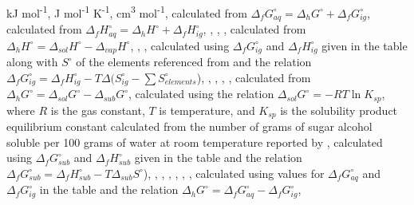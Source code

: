 {\begin{landscape}
\begin{table}
\begin{adjustbox}{width=600pt,keepaspectratio}
\begin{threeparttable}
  
  \begin{tablenotes}
     kJ mol\textsuperscript{-1},
     J mol\textsuperscript{-1} K\textsuperscript{-1},
     cm\textsuperscript{3} mol\textsuperscript{-1},
     calculated from $\Delta_{f}G^{\circ}_{aq} = \Delta_{h}G^{\circ} + \Delta_{f}G^{\circ}_{ig}$,
     calculated from $\Delta_{f}H^{\circ}_{aq} = \Delta_{h}H^{\circ} + \Delta_{f}H^{\circ}_{ig}$,
     \cite{lian1982polyol},
     \cite{dipaola1977polyol},
     \cite{plyasunov2006corresponding},
     calculated from $\Delta_{h}H^{\circ} = \Delta_{sol}H^{\circ} - \Delta_{vap}H^{\circ}$,
     \cite{nichols1976thermochemistry},
     \cite{verevkin2004determination},
     calculated using $\Delta_{f}G^{\circ}_{ig}$ and $\Delta_{f}H^{\circ}_{ig}$ given in the table along with $S^{\circ}$ of the elements referenced from \cite{cox1989codata} and the relation $\Delta_{f}G^{\circ}_{ig} = \Delta_{f}H^{\circ}_{ig} - T\Delta(S_{ig}^{\circ}-\sum S_{elements}^{\circ}$),
     \cite{verevkin20091},
     \cite{chao1986thermodynamic},
     \cite{bastos1988thermodynamic},
     \cite{verevkin2015thermodynamic},
     calculated from $\Delta_{h}G^{\circ} = \Delta_{sol}G^{\circ} - \Delta_{sub}G^{\circ}$,
     calculated using the relation $\Delta_{sol}G^{\circ} = -RT\ln{K_{sp}}$, where $R$ is the gas constant, $T$ is temperature, and $K_{sp}$ is the solubility product equilibrium constant calculated from the number of grams of sugar alcohol soluble per 100 grams of water at room temperature reported by \cite{dehn1917comparative},
     calculated using $\Delta_{f}G^{\circ}_{sub}$ and $\Delta_{f}H^{\circ}_{sub}$ given in the table and the relation $\Delta_{f}G^{\circ}_{sub} = \Delta_{f}H^{\circ}_{sub} - T\Delta_{sub}S^{\circ}$),
     \cite{lopes2006determination},
     \cite{barone1990enthalpies},
     \cite{chavez1997hydrostatic},
     \cite{da2013thermochemistry},
     \cite{wang2013measurement},
     \cite{tewari1996thermodynamics},
     calculated using values for $\Delta_{f}G_{aq}^{\circ}$ and $\Delta_{f}G_{ig}^{\circ}$ in the table and the relation $\Delta_{h}G^{\circ} = \Delta_{f}G_{aq}^{\circ} - \Delta_{f}G_{ig}^{\circ}$,
     \cite{yaws1997handbook}
        

\end{tablenotes}
\end{threeparttable}
\end{adjustbox}
\end{table}
\end{landscape}}
